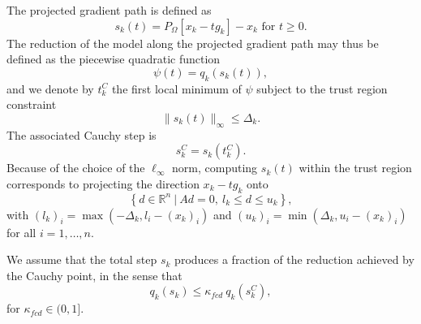 \documentclass{article}
\numberwithin{equation}{section}
\newcommand{\RR}{{\mathbb{R}}} %
\newcommand{\proj}[2]{P_{#1} \left[ {#2} \right]} %
\theoremstyle{plain}
\begin{document}
	The projected gradient path is defined as
	\[s_k(t)=\proj{\Omega}{x_k-tg_k}-x_k \text{ for } t\ge 0.\]
	The reduction of the model along the projected gradient path may thus be defined as the piecewise quadratic function
	\[\psi(t) = q_k(s_k(t)),\]
	and we denote by $t_k^C$ the first local minimum of $\psi$ subject to the trust region constraint 
	\begin{equation*}
		\|s_k(t)\|_\infty \le \Delta_k.
	\end{equation*}
	The associated Cauchy step is 
	\begin{equation*}
		s_k^C = s_k(t_k^C).
	\end{equation*}
	Because of the choice of the $\ell_\infty$ norm, computing $s_k(t)$ within the trust region corresponds to projecting the direction $x_k-tg_k$ onto
	\begin{equation}\label{eq:proj_grad_feasible_set}
		\left\{d \in \RR^n \ | \ Ad=0,\ l_k \le d \le u_k\right\},
	\end{equation}
	with $(l_k)_i = \max\left(-\Delta_k,l_i-(x_k)_i\right)$ and $(u_k)_i = \min\left(\Delta_k,u_i-(x_k)_i\right)$ for all $i=1,\ldots,n$.
	
	We assume that the total step $s_k$ produces a fraction of the reduction achieved by the Cauchy point, in the sense that
	\begin{equation}\label{eq:step_drecrease_wrt_cauchy}
		q_k(s_k) \le \kappa_{fcd} \ q_k(s_k^C),
	\end{equation}
	for $\kappa_{fcd} \in (0,1]$. 
	
\end{document}
